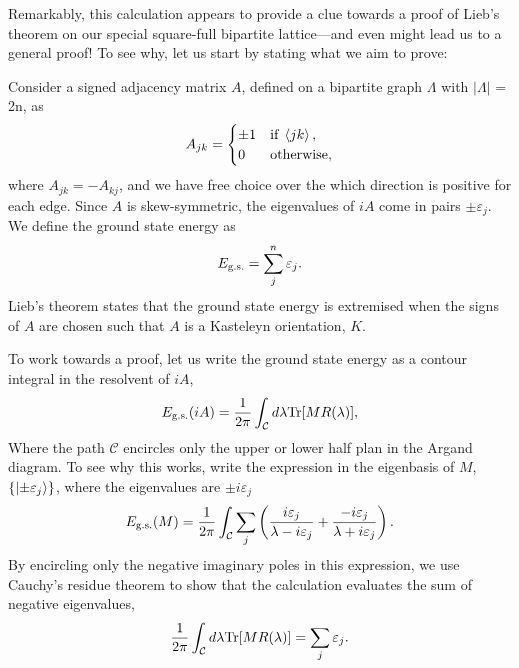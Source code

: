\documentclass[11pt, oneside]{article} %
\numberwithin{equation}{section}
\begin{document}
Remarkably, this calculation appears to provide a clue towards a proof of Lieb's theorem on our special square-full bipartite lattice---and even might lead us to a general proof! To see why, let us start by stating what we aim to prove:
\begin{theorem}
    Consider a signed adjacency matrix $A$, defined on a bipartite graph $\Lambda$ with $|\Lambda|$ = 2n, as 
    \begin{align}
        A_{jk} = \begin{cases}
            \pm 1 & \text{if}\; \braket{jk}, \\
            0 & \text{otherwise},
        \end{cases}
    \end{align}
    where $A_{jk} = - A_{kj}$, and we have free choice over the which direction is positive for each edge. Since $A$ is skew-symmetric, the eigenvalues of $iA$ come in pairs $\pm \varepsilon_{j}$. We define the ground state energy as 
    \begin{align}
        E_\textup{g.s.} = \sum_{j}^n \varepsilon_j.
    \end{align}
    Lieb's theorem states that the ground state energy is extremised when the signs of $A$ are chosen such that $A$ is a Kasteleyn orientation, $K$. 
\end{theorem}

To work towards a proof, let us write the ground state energy as a contour integral in the resolvent of $iA$,
\begin{align}
    E_\textup{g.s.}(iA) =\frac{1}{2\pi}\int_{\mathcal C}d\lambda \textup{Tr} [M R(\lambda)],
\end{align}
Where the path $\mathcal C$ encircles only the upper or lower half plan in the Argand diagram. To see why this works, write the expression in the eigenbasis of $M$, $\{\ket {\pm \varepsilon_j}\}$, where the eigenvalues are $\pm i\varepsilon_j$
\begin{align}
    E_\textup{g.s.}(M) =\frac{1}{2\pi}\int_{\mathcal C}\sum_{j} \left ( 
        \frac{i \varepsilon_j}{\lambda - i \varepsilon_j}
         + 
        \frac{-i \varepsilon_j}{\lambda + i \varepsilon_j}
        \right ).
\end{align}
By encircling only the negative imaginary poles in this expression, we use Cauchy's residue theorem to show that the calculation evaluates the sum of negative eigenvalues,
\begin{align}
    \frac{1}{2\pi}\int_{\mathcal C}d\lambda \textup{Tr} [M R(\lambda)] = \sum_{j} \varepsilon_j.
\end{align}
\end{document}
